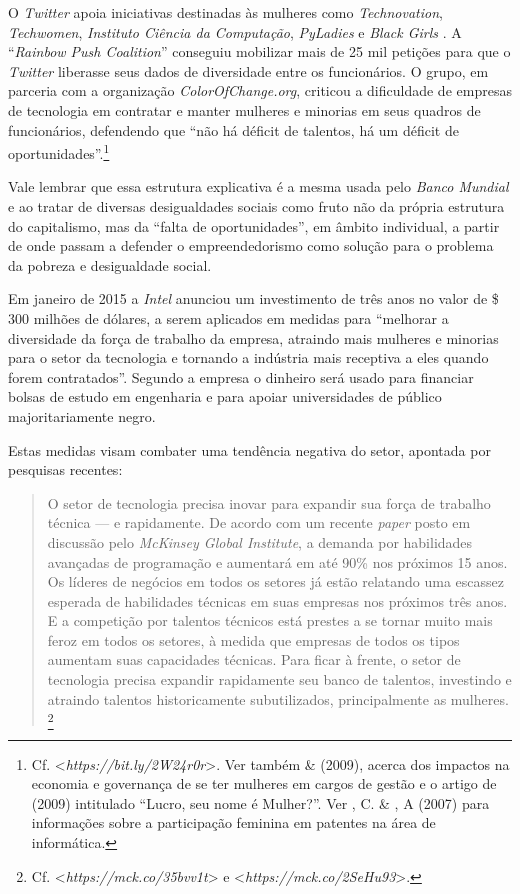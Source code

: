O \emph{Twitter} apoia iniciativas destinadas às mulheres como
\emph{Technovation}, \emph{Techwomen}, \emph{ Instituto Ciência da
Computação}, \emph{PyLadies} e \emph{Black Girls }. A
``\emph{Rainbow Push Coalition}'' conseguiu mobilizar mais de 25 mil
petições para que o \emph{Twitter} liberasse seus dados de diversidade
entre os funcionários. O grupo, em parceria com a organização
\emph{ColorOfChange.org}, criticou a dificuldade de empresas de
tecnologia em contratar e manter mulheres e minorias em seus quadros de
funcionários, defendendo que ``não há déficit de talentos, há um déficit
de oportunidades''.\footnote{Cf.
  \textless{}\emph{https://bit.ly/2W24r0r}\textgreater{}.
  Ver também  \&  (2009), acerca dos impactos na economia e
  governança de se ter mulheres em cargos de gestão e o artigo de 
  (2009) intitulado ``Lucro, seu nome é Mulher?''. Ver , C. \&
  , A (2007) para informações sobre a participação feminina em
  patentes na área de informática.}

Vale lembrar que essa estrutura explicativa é a mesma usada pelo
\emph{Banco Mundial} e \emph{} ao tratar de diversas desigualdades
sociais como fruto não da própria estrutura do capitalismo, mas da
``falta de oportunidades'', em âmbito individual, a partir de onde
passam a defender o empreendedorismo como solução para o problema da
pobreza e desigualdade social.

Em janeiro de 2015 a \emph{Intel} anunciou um investimento de três anos
no valor de \$ 300 milhões de dólares, a serem aplicados em medidas
para ``melhorar a diversidade da força de trabalho da empresa, atraindo
mais mulheres e minorias para o setor da tecnologia e tornando a
indústria mais receptiva a eles quando forem contratados''. Segundo a
empresa o dinheiro será usado para financiar bolsas de estudo em
engenharia e para apoiar universidades de público majoritariamente
negro.

Estas medidas visam combater uma tendência negativa do setor, apontada
por pesquisas recentes:

\begin{quote}
O setor de tecnologia precisa inovar para expandir sua força de trabalho
técnica --- e rapidamente. De acordo com um recente \emph{paper} posto em
discussão pelo \emph{McKinsey Global Institute}, a demanda por
habilidades avançadas de programação e  aumentará em até 90\% nos
próximos 15 anos. Os líderes de negócios em todos os setores já estão
relatando uma escassez esperada de habilidades técnicas em suas empresas
nos próximos três anos. E a competição por talentos técnicos está
prestes a se tornar muito mais feroz em todos os setores, à medida que
empresas de todos os tipos aumentam suas capacidades técnicas. Para
ficar à frente, o setor de tecnologia precisa expandir rapidamente seu
banco de talentos, investindo e atraindo talentos historicamente
subutilizados, principalmente as mulheres. \footnote{Cf.
  \textless{}\emph{https://mck.co/35bvv1t}\textgreater{}
  e \textless{}\emph{https://mck.co/2SeHu93}\textgreater{}.}
\end{quote}

